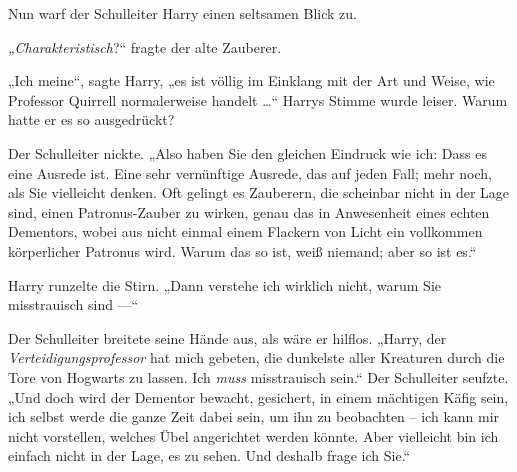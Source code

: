 Nun warf der Schulleiter Harry einen seltsamen Blick zu.

\emph{„Charakteristisch}?“ fragte der alte Zauberer.

„Ich meine“, sagte Harry, „es ist völlig im Einklang mit der Art und Weise, wie Professor Quirrell normalerweise handelt …“ Harrys Stimme wurde leiser. Warum hatte er es so ausgedrückt?

Der Schulleiter nickte.
„Also haben Sie den gleichen Eindruck wie ich: Dass es eine Ausrede ist. Eine sehr vernünftige Ausrede, das auf jeden Fall; mehr noch, als Sie vielleicht denken. Oft gelingt es Zauberern, die scheinbar nicht in der Lage sind, einen Patronus-Zauber zu wirken, genau das in Anwesenheit eines echten Dementors, wobei aus nicht einmal einem Flackern von Licht ein vollkommen körperlicher Patronus wird. Warum das so ist, weiß niemand; aber so ist es.“

Harry runzelte die Stirn.
„Dann verstehe ich wirklich nicht, warum Sie misstrauisch sind —“

Der Schulleiter breitete seine Hände aus, als wäre er hilflos.
„Harry, der \emph{Verteidigungsprofessor} hat mich gebeten, die dunkelste aller Kreaturen durch die Tore von Hogwarts zu lassen. Ich \emph{muss} misstrauisch sein.“ Der Schulleiter seufzte.
„Und doch wird der Dementor bewacht, gesichert, in einem mächtigen Käfig sein, ich selbst werde die ganze Zeit dabei sein, um ihn zu beobachten – ich kann mir nicht vorstellen, welches Übel angerichtet werden könnte. Aber vielleicht bin ich einfach nicht in der Lage, es zu sehen. Und deshalb frage ich Sie.“

